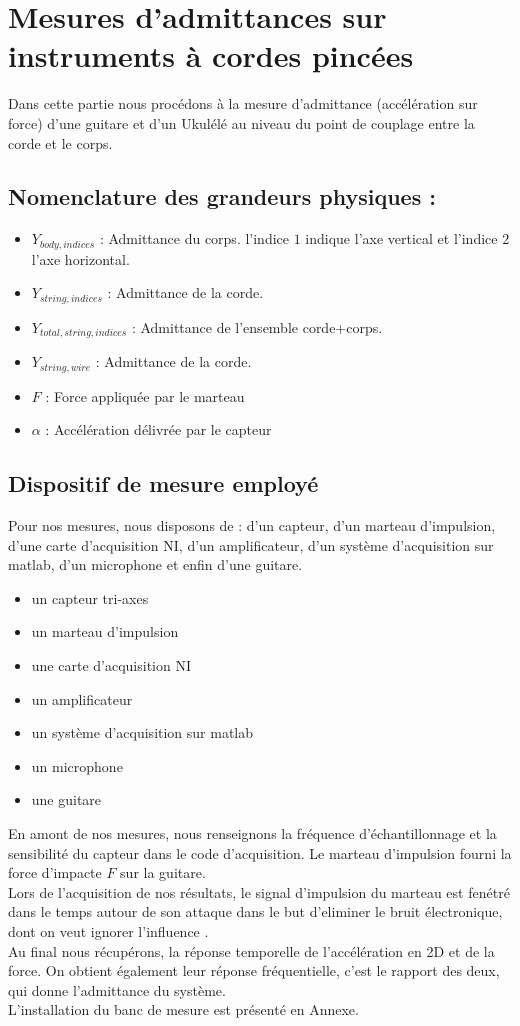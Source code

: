 \chapter{Mesures d'admittances sur instruments à cordes pincées}
Dans cette partie nous procédons à la mesure d'admittance (accélération sur force) d'une guitare et d'un Ukulélé au niveau du point de couplage entre la corde et le corps.
\section{Nomenclature des grandeurs physiques : \\} 
\begin{itemize}
\item $Y_{body,indices}$ : Admittance du corps. l'indice $1$ indique l'axe vertical et l'indice $2$ l'axe horizontal.
\item $Y_{string,indices}$ : Admittance de la corde.
\item $Y_{total,string,indices}$ : Admittance de l'ensemble corde+corps.
\item $Y_{string,wire}$ : Admittance de la corde.
\item $F$ : Force appliquée par le marteau 
\item $\alpha$ : Accélération délivrée par le capteur 
\end{itemize}

\section{Dispositif de mesure employé}
Pour nos mesures, nous disposons de :  d'un capteur, d'un marteau d'impulsion, d'une carte d'acquisition NI, d'un amplificateur, d'un système d'acquisition sur matlab, d'un microphone et enfin d'une guitare. 
\begin{itemize}
\item un capteur tri-axes
\item un marteau d'impulsion
\item une carte d'acquisition NI
\item un amplificateur
\item un système d'acquisition sur matlab
\item un microphone
\item une guitare
\end{itemize}
En amont de nos mesures, nous renseignons la fréquence d'échantillonnage et la sensibilité du capteur dans le code d'acquisition. Le marteau d'impulsion fourni la force d'impacte $F$ sur la guitare. \\
Lors de l'acquisition de nos résultats, le signal d'impulsion du marteau est fenétré dans le temps autour de son attaque dans le but d'eliminer le bruit électronique, dont on veut ignorer l'influence . \\
Au final nous récupérons, la réponse temporelle de l'accélération en 2D et de la force. On obtient également leur réponse fréquentielle, c'est le rapport des deux, qui donne l'admittance du système.\\
L'installation du banc de mesure est présenté en Annexe. %

